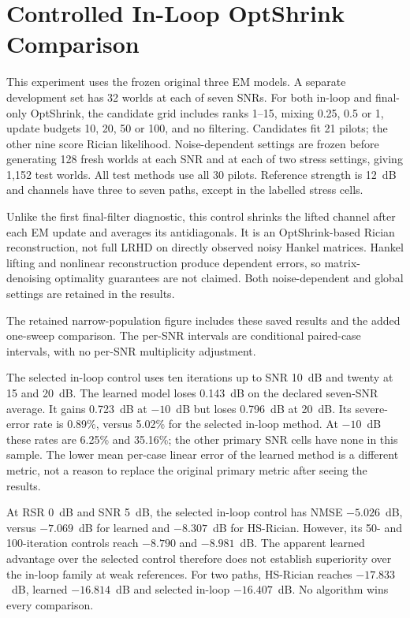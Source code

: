 \section{Controlled In-Loop OptShrink Comparison}
This experiment uses the frozen original three EM models. A separate
development set has 32 worlds at each of seven SNRs. For both in-loop and
final-only OptShrink, the candidate grid includes ranks 1--15, mixing
0.25, 0.5 or 1, update budgets 10, 20, 50 or 100, and no filtering.
Candidates fit 21 pilots; the other nine score Rician likelihood.
Noise-dependent settings are frozen before generating 128 fresh worlds
at each SNR and at each of two stress settings, giving 1,152 test worlds.
All test methods use all 30 pilots. Reference strength is 12~dB and
channels have three to seven paths, except in the labelled stress cells.

Unlike the first final-filter diagnostic, this control shrinks the lifted
channel after each EM update and averages its antidiagonals. It is an
OptShrink-based Rician reconstruction, not full LRHD on directly observed
noisy Hankel matrices. Hankel lifting and nonlinear reconstruction produce
dependent errors, so matrix-denoising optimality guarantees are not claimed.
Both noise-dependent and global settings are retained in the results.

The retained narrow-population figure includes these saved results
and the added one-sweep comparison. The per-SNR intervals are conditional
paired-case intervals, with no per-SNR multiplicity adjustment.

The selected in-loop control uses ten iterations up to SNR 10~dB and
twenty at 15 and 20~dB. The learned model loses 0.143~dB on the declared
seven-SNR average. It gains 0.723~dB at $-10$~dB but loses 0.796~dB at
20~dB. Its severe-error rate is 0.89\%, versus 5.02\% for the selected
in-loop method. At $-10$~dB these rates are 6.25\% and 35.16\%; the
other primary SNR cells have none in this sample. The lower mean per-case
linear error of the learned method is a different metric, not a reason
to replace the original primary metric after seeing the results.

At RSR 0~dB and SNR 5~dB, the selected in-loop control has NMSE
$-5.026$~dB, versus $-7.069$~dB for learned and $-8.307$~dB for HS-Rician.
However, its 50- and 100-iteration controls reach $-8.790$ and $-8.981$~dB.
The apparent learned advantage over the selected control therefore does
not establish superiority over the in-loop family at weak references.
For two paths, HS-Rician reaches $-17.833$~dB, learned $-16.814$~dB and
selected in-loop $-16.407$~dB. No algorithm wins every comparison.

